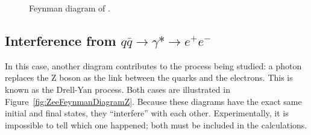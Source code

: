 \begin{figure}[htb]
\begin{center}
\end{center}
  \caption[\fixspacing Feynman diagram of \qqZee]
	  {\fixspacing Feynman diagram of \qqZee.  
	    }
  \label{fig:ZeeFeynmanDiagram}
\end{figure}

\subsection{Interference from $q \bar{q} \rightarrow \gamma* \rightarrow e^+ e^-$}
\label{theory:DY}
In this case, another diagram contributes 
to the process being studied: 
a photon replaces the Z boson 
as the link between the quarks and the electrons.  
This is known as the Drell-Yan process.
Both cases are illustrated in 
Figure~\ref{fig:ZeeFeynmanDiagramZ}. 
Because these diagrams have the exact same 
initial and final states, 
they ``interfere'' with each other.  
Experimentally, it is impossible to tell which one happened; 
both must be included in the calculations.  %

